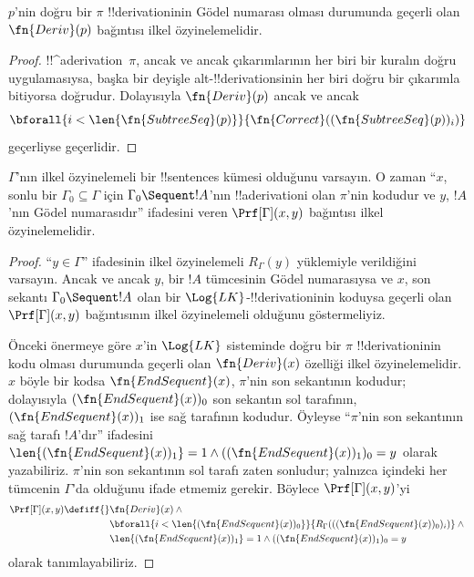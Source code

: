 \documentclass[../../../include/open-logic-section]{subfiles}
\begin{document}
\begin{prop}
  $p$'nin doğru bir $\pi$ !!{derivation}{}inin Gödel numarası olması durumunda
  geçerli olan $\fn{Deriv}(p)$ bağıntısı ilkel özyinelemelidir.
\end{prop}

\begin{proof}
  !!^a{derivation}~$\pi$, ancak ve ancak çıkarımlarının her biri bir kuralın
  doğru uygulamasıysa, başka bir deyişle alt-!!{derivation}s{}inin her biri
  doğru bir çıkarımla bitiyorsa doğrudur. Dolayısıyla $\fn{Deriv}(p)$ ancak
  ve ancak
  \[
  \bforall{i<\len{\fn{SubtreeSeq}(p)}}{\fn{Correct}((\fn{SubtreeSeq}(p))_i)}
  \]
  geçerliyse geçerlidir.
\end{proof}


\begin{prop}
$\Gamma$'nın ilkel özyinelemeli bir !!{sentence}s kümesi olduğunu varsayın.
O zaman ``$x$, sonlu bir $\Gamma_0 \subseteq \Gamma$ için
$\Gamma_0 \Sequent !A$'nın !!a{derivation}{}i olan $\pi$'nin kodudur ve $y$,
$!A$'nın Gödel numarasıdır'' ifadesini veren $\Prf[\Gamma](x, y)$ bağıntısı
ilkel özyinelemelidir.
\end{prop}

\begin{proof}
``$y \in \Gamma$'' ifadesinin ilkel özyinelemeli $R_\Gamma(y)$ yüklemiyle
verildiğini varsayın. Ancak ve ancak $y$, bir $!A$ tümcesinin Gödel
numarasıysa ve $x$, son sekantı $\Gamma_0 \Sequent !A$ olan bir
$\Log{LK}$-!!{derivation}{}inin koduysa geçerli olan $\Prf[\Gamma](x, y)$
bağıntısının ilkel özyinelemeli olduğunu göstermeliyiz.

Önceki önermeye göre $x$'in $\Log{LK}$ sisteminde doğru bir $\pi$
!!{derivation}{}inin kodu olması durumunda geçerli olan $\fn{Deriv}(x)$
özelliği ilkel özyinelemelidir. $x$ böyle bir kodsa
$\fn{EndSequent}(x)$, $\pi$'nin son sekantının kodudur; dolayısıyla
$(\fn{EndSequent}(x))_0$ son sekantın sol tarafının, 
$(\fn{EndSequent}(x))_1$ ise sağ tarafının kodudur. Öyleyse
``$\pi$'nin son sekantının sağ tarafı $!A$'dır'' ifadesini
$\len{(\fn{EndSequent}(x))_1} = 1 \land ((\fn{EndSequent}(x))_1)_0 = y$
olarak yazabiliriz. $\pi$'nin son sekantının sol tarafı zaten sonludur;
yalnızca içindeki her tümcenin $\Gamma$'da olduğunu ifade etmemiz gerekir.
Böylece $\Prf[\Gamma](x, y)$'yi
\begin{align*}
\Prf[\Gamma](x, y) \defiff {}&
\fn{Deriv}(x) \land {} \\
& \bforall{i <
  \len{(\fn{EndSequent}(x))_0}}{R_\Gamma(((\fn{EndSequent}(x))_0)_i)} \land {}\\
& \len{(\fn{EndSequent}(x))_1} = 1 \land ((\fn{EndSequent}(x))_1)_0 = y
\end{align*}
olarak tanımlayabiliriz.
\end{proof}
\end{document}
